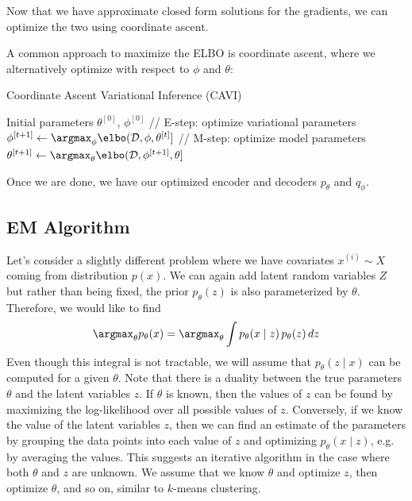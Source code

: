   Now that we have approximate closed form solutions for the gradients, we can optimize the two using coordinate ascent. 

  \begin{algo}
    A common approach to maximize the ELBO is coordinate ascent, where we alternatively optimize with respect to $\phi$ and $\theta$:

    \begin{algorithm}[H]
      \caption{Coordinate Ascent Variational Inference (CAVI)}
      \begin{algorithmic}[1]
        \Require Initial parameters $\theta^{[0]}$, $\phi^{[0]}$
          \State // E-step: optimize variational parameters
          \State $\phi^{[t+1]} \gets \argmax_\phi \elbo(\mathcal{D}, \phi, \theta^{[t]}]$
          \State // M-step: optimize model parameters
          \State $\theta^{[t+1]} \gets \argmax_\theta \elbo(\mathcal{D}, \phi^{[t+1]}, \theta]$
        \EndWhile
      \end{algorithmic}
    \end{algorithm}
  \end{algo} 

  Once we are done, we have our optimized encoder and decoders $p_\theta$ and $q_\phi$. 
  
\subsection{EM Algorithm} 

  Let's consider a slightly different problem where we have covariates $x^{(i)} \sim X$ coming from distribution $p(x)$. We can again add latent random variables $Z$ but rather than being fixed, the prior $p_\theta (z)$ is also parameterized by $\theta$. Therefore, we would like to find 
  \begin{equation}
    \argmax_\theta p_\theta (x) = \argmax_\theta \int p_\theta (x \mid z) \, p_\theta (z) \,dz
  \end{equation} 
  Even though this integral is not tractable, we will assume that $p_\theta (z \mid x)$ can be computed for a given $\theta$. Note that there is a duality between the true parameters $\theta$ and the latent variables $z$. If $\theta$ is known, then the values of $z$ can be found by maximizing the log-likelihood over all possible values of $z$. Conversely, if we know the value of the latent variables $z$, then we can find an estimate of the parameters by grouping the data points into each value of $z$ and optimizing $p_\theta (x \mid z)$, e.g. by averaging the values. This suggests an iterative algorithm in the case where both $\theta$ and $z$ are unknown. We assume that we know $\theta$ and optimize $z$, then optimize $\theta$, and so on, similar to $k$-means clustering. 

